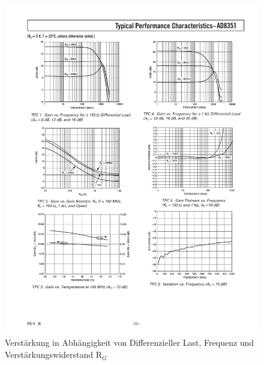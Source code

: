 \begin{figure}[h!]
	\centering
	\includegraphics[width=1.0\textwidth, trim=20mm 180mm 15mm 30mm, clip=true]{images/Gain}
	\caption[Verstärkung in Abhängigkeit von Differenzieller Last, Frequenz und Verstärkungs-widerstand R$_G$]{Verstärkung in Abhängigkeit von Differenzieller Last, Frequenz und Verstärkungswiderstand R$_G$\cite[p. 7]{ad8351}}
	\label{fig:graph_gain}
\end{figure}
